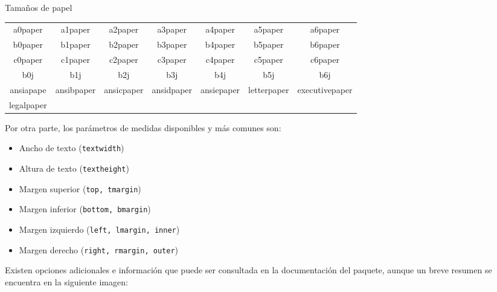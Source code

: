 \documentclass[a4,11pt]{aleph-notas-alpha}
\begin{document}
\encabezado

\informacion

\tableofcontents

\newpage
\vspace*{-18mm}


\begin{tabla}[label={tab:papersize}]{Tamaños de papel}
  \begin{tabular}{ccccccc}
    a0paper & a1paper & a2paper & a3paper & a4paper & a5paper & a6paper \\ b0paper & b1paper & b2paper & b3paper & b4paper & b5paper &  b6paper \\ c0paper & c1paper & c2paper & c3paper & c4paper & c5paper & c6paper \\ 
    b0j & b1j & b2j & b3j& b4j& b5j& b6j \\
    ansiapape & ansibpaper & ansicpaper & ansidpaper & ansiepaper & letterpaper & executivepaper \\  legalpaper 
  \end{tabular}
\end{tabla}

Por otra parte, los parámetros de medidas disponibles y más comunes son:

\begin{itemize}
    \item Ancho de texto (\texttt{textwidth})
    \item Altura de texto (\texttt{textheight})
    \item Margen superior (\texttt{top, tmargin})
    \item Margen inferior (\texttt{bottom, bmargin})
    \item Margen izquierdo (\texttt{left, lmargin, inner})
    \item Margen derecho (\texttt{right, rmargin, outer})
\end{itemize}

Existen opciones adicionales e información que puede ser consultada en la documentación del paquete, aunque un breve resumen se encuentra en la siguiente imagen:
\end{document}
